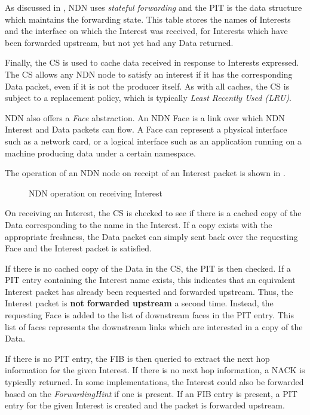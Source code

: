 As discussed in , NDN uses \textit{stateful forwarding} and the PIT is the data structure which maintains the forwarding state. This table stores the names of Interests and the interface on which the Interest was received, for Interests which have been forwarded upstream, but not yet had any Data returned.

Finally, the CS is used to cache data received in response to Interests expressed. The CS allows any NDN node to satisfy an interest if it has the corresponding Data packet, even if it is not the producer itself. As with all caches, the CS is subject to a replacement policy, which is typically \textit{Least Recently Used (LRU)}.

NDN also offers a \textit{Face} abstraction. An NDN Face is a link over which NDN Interest and Data packets can flow. A Face can represent a physical interface such as a network card, or a logical interface such as an application running on a machine producing data under a certain namespace.


The operation of an NDN node on receipt of an Interest packet is shown in .  

\begin{figure}[H]
    \centering
    \caption{NDN operation on receiving Interest}
    \label{fig:ndn-on-interest}
\end{figure}

On receiving an Interest, the CS is checked to see if there is a cached copy of the Data corresponding to the name in the Interest. If a copy exists with the appropriate freshness, the Data packet can simply sent back over the requesting Face and the Interest packet is satisfied. 

If there is no cached copy of the Data in the CS, the PIT is then checked. If a PIT entry containing the Interest name exists, this indicates that an equivalent Interest packet has already been requested and forwarded upstream. Thus, the Interest packet is \textbf{not forwarded upstream} a second time. Instead, the requesting Face is added to the list of downstream faces in the PIT entry. This list of faces represents the downstream links which are interested in a copy of the Data.

If there is no PIT entry, the FIB is then queried to extract the next hop information for the given Interest. If there is no next hop information, a NACK is typically returned. In some implementations, the Interest could also be forwarded based on the \textit{ForwardingHint} if one is present. If an FIB entry is present, a PIT entry for the given Interest is created and the packet is forwarded upstream. 

